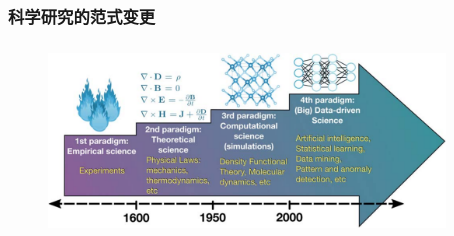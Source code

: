 \small
%
\frame
{
	\frametitle{科学研究的范式变更}
\begin{figure}[h!]
\vspace*{0.08in}
\centering
\includegraphics[height=2.00in,width=4.15in]{Figures/Four_Model_3.png}
\label{Four_Model}
\end{figure}
}

